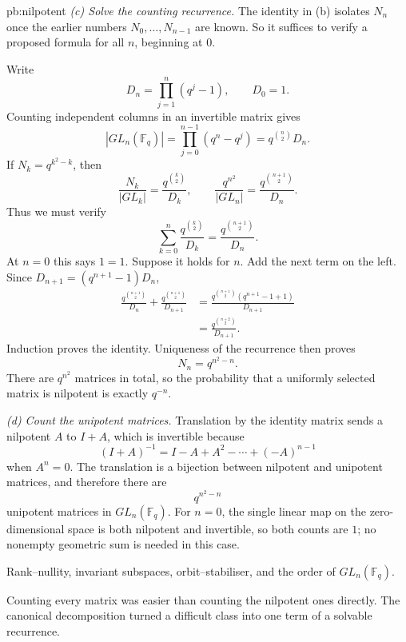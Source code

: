 \begin{solution}{pb:nilpotent}
\emph{(c) Solve the counting recurrence.}
The identity in (b) isolates $N_n$ once the earlier numbers $N_0,\ldots,N_{n-1}$ are known. So it suffices to verify a proposed formula for all $n$, beginning at $0$.

Write
\[
D_n=\prod_{j=1}^n(q^j-1),\qquad D_0=1.
\]
Counting independent columns in an invertible matrix gives
\[
|GL_n(\mathbb F_q)|=\prod_{j=0}^{n-1}(q^n-q^j)
=q^{\binom n2}D_n.
\]
If $N_k=q^{k^2-k}$, then
\[
\frac{N_k}{|GL_k|}
=\frac{q^{\binom k2}}{D_k},
\qquad
\frac{q^{n^2}}{|GL_n|}
=\frac{q^{\binom{n+1}2}}{D_n}.
\]
Thus we must verify
\[
\sum_{k=0}^n\frac{q^{\binom k2}}{D_k}
=\frac{q^{\binom{n+1}2}}{D_n}.
\]
At $n=0$ this says $1=1$. Suppose it holds for $n$. Add the next term on the left. Since $D_{n+1}=(q^{n+1}-1)D_n$,
\[
\begin{aligned}
\frac{q^{\binom{n+1}2}}{D_n}
+\frac{q^{\binom{n+1}2}}{D_{n+1}}
&=\frac{q^{\binom{n+1}2}(q^{n+1}-1+1)}{D_{n+1}}\\
&=\frac{q^{\binom{n+2}2}}{D_{n+1}}.
\end{aligned}
\]
Induction proves the identity. Uniqueness of the recurrence then proves
\[
\boxed{N_n=q^{n^2-n}}.
\]
There are $q^{n^2}$ matrices in total, so the probability that a uniformly selected matrix is nilpotent is exactly $q^{-n}$.

\emph{(d) Count the unipotent matrices.}
Translation by the identity matrix sends a nilpotent $A$ to $I+A$, which is invertible because
\[
(I+A)^{-1}=I-A+A^2-\cdots+(-A)^{n-1}
\]
when $A^n=0$. The translation is a bijection between nilpotent and unipotent matrices, and therefore there are
\[
\boxed{q^{n^2-n}}
\]
unipotent matrices in $GL_n(\mathbb F_q)$.
For $n=0$, the single linear map on the zero-dimensional space is both
nilpotent and invertible, so both counts are $1$; no nonempty geometric
sum is needed in this case.

\tools Rank--nullity, invariant subspaces, orbit--stabiliser, and the order of $GL_n(\mathbb F_q)$.

\leads Counting every matrix was easier than counting the nilpotent ones directly. The canonical decomposition turned a difficult class into one term of a solvable recurrence.
\end{solution}

